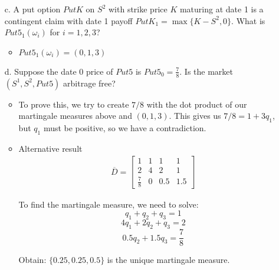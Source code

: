 \documentclass[12pt]{article}
\renewcommand{\o}{\omega}
\newcommand{\ol}{\overline}
\newcommand{\Ex}{\mathbf{E}}
\begin{document}
\begin{enumerate}
\begin{itemize}
  \item[c.] A put option $PutK$ on $S^2$ with strike price $K$ maturing at date 1 is a contingent claim with date 1 payoff $PutK_1 = \max\{K - S^2, 0\}$. What is $Put5_1(\o_i)$ for $i = 1, 2, 3$?
  \begin{itemize}
      \item $Put5_1(\o_i)=(0,1,3)$
  \end{itemize}

\begin{comment}  
  \textit{Solution}: $Put5_1 = \begin{bmatrix} 0 & 1 & 3 \end{bmatrix}$.
\end{comment}
  
  \item[d.] Suppose the date 0 price of $Put5$ is $Put5_0 = \frac{7}{8}$. Is the market $(S^1, S^2, Put5)$ arbitrage free?
  \begin{itemize}
   
      \item  To prove this, we try to create $7/8$ with the dot product of our martingale measures above and $(0,1,3)$.  This gives us $7/8 = 1+3q_1$, but $q_1$ must be positive, so we have a contradiction.
      
      
  \item Alternative result
        \begin{align*}
    \ol{D}=
    \left[\begin{array}{llll}
    1 & 1 & 1 & 1\\
    2 & 4 & 2 & 1 \\
    \frac{7}{8} & 0 & 0.5 & 1.5
    \end{array}
    \right]
    \end{align*}
    
    To find the martingale measure, we need to solve:
    $$q_1+q_2+q_3 = 1$$
    $$4q_1+2q_2+q_3=2$$
   $$ 0.5q_2+1.5q_3=\frac{7}{8}$$
   
   Obtain: $\{0.25,0.25,0.5\} $ is the unique martingale measure.

  \end{itemize}

\begin{comment}  
  \textit{Solution}: To show $(S^1, S^2, Put5)$ is arbitrage free amounts to finding a martingale measure $Q$ of the normalized market $(1, S^2/S^1)$ with $S^1$ as numeraire such that, in addition, $\frac{7}{8} = \frac{1}{2} \Ex^Q Put5_1$.
  

\end{comment}
\end{itemize}
\end{enumerate}
\end{document}
